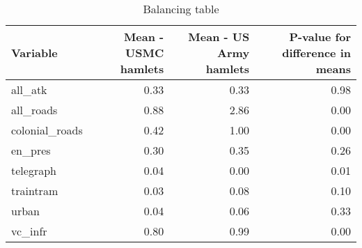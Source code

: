\begin{table}[ht]
\centering
\begin{tabular}{lrrr}
  \hline
Variable & Mean - USMC hamlets & Mean - US Army hamlets & P-value for difference in means \\ 
  \hline
all\_atk & 0.33 & 0.33 & 0.98 \\ 
  all\_roads & 0.88 & 2.86 & 0.00 \\ 
  colonial\_roads & 0.42 & 1.00 & 0.00 \\ 
  en\_pres & 0.30 & 0.35 & 0.26 \\ 
  telegraph & 0.04 & 0.00 & 0.01 \\ 
  traintram & 0.03 & 0.08 & 0.10 \\ 
  urban & 0.04 & 0.06 & 0.33 \\ 
  vc\_infr & 0.80 & 0.99 & 0.00 \\ 
   \hline
\end{tabular}
\caption{Balancing table} 
\end{table}
